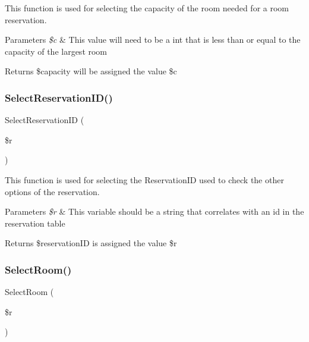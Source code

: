 This function is used for selecting the capacity of the room needed for a room reservation. 
\begin{DoxyParams}{Parameters}
{\em \$c} & This value will need to be a int that is less than or equal to the capacity of the largest room \\
\hline
\end{DoxyParams}
\begin{DoxyReturn}{Returns}
\$capacity will be assigned the value \$c 
\end{DoxyReturn}
\mbox{\label{_room___selection_8class_8php_a844d4eb0022335945cf36729cbeee645}} 
\subsubsection{\texorpdfstring{SelectReservationID()}{SelectReservationID()}}
{\footnotesize\ttfamily Select\+Reservation\+ID (\begin{DoxyParamCaption}\item[{}]{\$r }\end{DoxyParamCaption})}

This function is used for selecting the Reservation\+ID used to check the other options of the reservation. 
\begin{DoxyParams}{Parameters}
{\em \$r} & This variable should be a string that correlates with an id in the reservation table \\
\hline
\end{DoxyParams}
\begin{DoxyReturn}{Returns}
\$reservation\+ID is assigned the value \$r 
\end{DoxyReturn}
\mbox{\label{_room___selection_8class_8php_a15f7f352af1caf97b352f4db79d5c932}} 
\subsubsection{\texorpdfstring{SelectRoom()}{SelectRoom()}}
{\footnotesize\ttfamily Select\+Room (\begin{DoxyParamCaption}\item[{}]{\$r }\end{DoxyParamCaption})}

